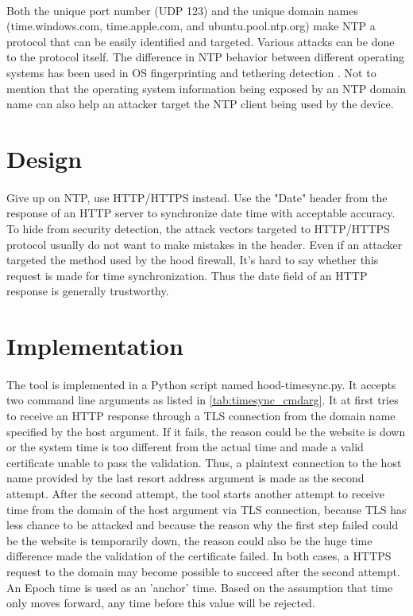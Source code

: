 \documentclass[mscthesis]{usiinfthesis}
\begin{document}
\paragraph{}
Both the unique port number (UDP 123) and the unique domain names (time.windows.com, time.apple.com, and ubuntu.pool.ntp.org) make NTP a protocol that can be easily identified and targeted. Various attacks can be done to the protocol itself\citep{ntp:attack}. The difference in NTP behavior between different operating systems has been used in OS fingerprinting and tethering detection \citep{osandtether}. Not to mention that the operating system information being exposed by an NTP domain name can also help an attacker target the NTP client being used by the device.

\section{Design}
\paragraph{}
Give up on NTP, use HTTP/HTTPS instead. Use the "Date" header from the response of an HTTP server to synchronize date time with acceptable accuracy. To hide from security detection, the attack vectors targeted to HTTP/HTTPS protocol usually do not want to make mistakes in the header. Even if an attacker targeted the method used by the hood firewall, It's hard to say whether this request is made for time synchronization. Thus the date field of an HTTP response is generally trustworthy.

\section{Implementation}
\paragraph{}
The tool is implemented in a Python script named hood-timesync.py. It accepts two command line arguments as listed in \cref{tab:timesync_cmdarg}. It at first tries to receive an HTTP response through a TLS connection from the domain name specified by the host argument. If it fails, the reason could be the website is down or the system time is too different from the actual time and made a valid certificate unable to pass the validation. Thus, a plaintext connection to the host name provided by the last resort address argument is made as the second attempt. After the second attempt, the tool starts another attempt to receive time from the domain of the host argument via TLS connection, because TLS has less chance to be attacked and because the reason why the first step failed could be the website is temporarily down, the reason could also be the huge time difference made the validation of the certificate failed. In both cases, a HTTPS request to the domain may become possible to succeed after the second attempt. An Epoch time is used as an 'anchor' time. Based on the assumption that time only moves forward, any time before this value will be rejected.
\end{document}
